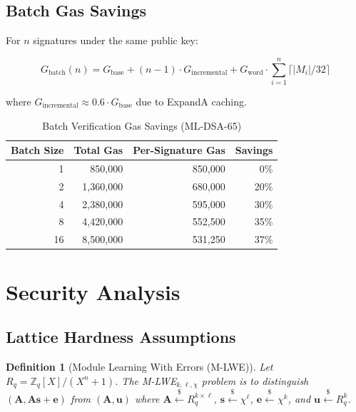 \documentclass[11pt,a4paper]{article}
\newtheorem{definition}{Definition}
\begin{document}
\subsection{Batch Gas Savings}

For $n$ signatures under the same public key:

\begin{equation}
G_{\text{batch}}(n) = G_{\text{base}} + (n-1) \cdot G_{\text{incremental}} + G_{\text{word}} \cdot \sum_{i=1}^n \lceil |M_i| / 32 \rceil
\end{equation}

where $G_{\text{incremental}} \approx 0.6 \cdot G_{\text{base}}$ due to ExpandA caching.

\begin{table}[htbp]
\centering
\caption{Batch Verification Gas Savings (ML-DSA-65)}
\label{tab:batch}
\begin{tabular}{@{}rrrr@{}}
\toprule
Batch Size & Total Gas & Per-Signature Gas & Savings \\
\midrule
1 & 850,000 & 850,000 & 0\% \\
2 & 1,360,000 & 680,000 & 20\% \\
4 & 2,380,000 & 595,000 & 30\% \\
8 & 4,420,000 & 552,500 & 35\% \\
16 & 8,500,000 & 531,250 & 37\% \\
\bottomrule
\end{tabular}
\end{table}

\section{Security Analysis}

\subsection{Lattice Hardness Assumptions}

\begin{definition}[Module Learning With Errors (M-LWE)]
Let $R_q = \mathbb{Z}_q[X]/(X^n + 1)$. The M-LWE$_{k,\ell,\chi}$ problem is to distinguish $(\mathbf{A}, \mathbf{A}\mathbf{s} + \mathbf{e})$ from $(\mathbf{A}, \mathbf{u})$ where $\mathbf{A} \xleftarrow{\$} R_q^{k \times \ell}$, $\mathbf{s} \xleftarrow{\$} \chi^\ell$, $\mathbf{e} \xleftarrow{\$} \chi^k$, and $\mathbf{u} \xleftarrow{\$} R_q^k$.
\end{definition}
\end{document}
